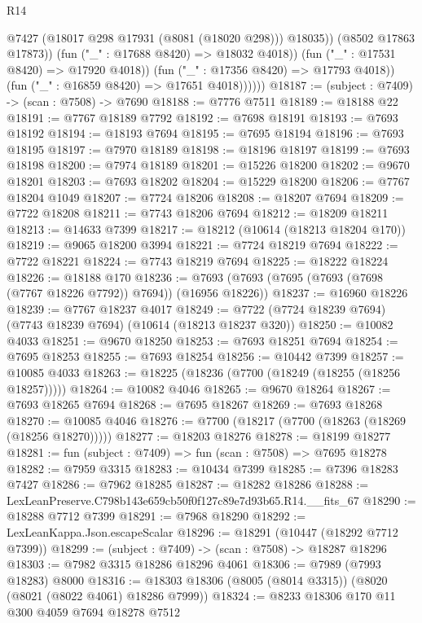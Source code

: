 \begin{lexlean}{R14}
\begin{coremodule}
                          @7427
                          (@18017 @298 @17931 (@8081 (@18020 @298)))
                          @18035))
                      (@8502 @17863 @17873))
                    (fun ("_" : @17688 @8420) => @18032 @4018))
                  (fun ("_" : @17531 @8420) => @17920 @4018))
                (fun ("_" : @17356 @8420) => @17793 @4018))
              (fun ("_" : @16859 @8420) => @17651 @4018))))))
@18187 := (subject : @7409) -> (scan : @7508) -> @7690
@18188 := @7776 @7511
@18189 := @18188 @22
@18191 := @7767 @18189 @7792
@18192 := @7698 @18191
@18193 := @7693 @18192
@18194 := @18193 @7694
@18195 := @7695 @18194
@18196 := @7693 @18195
@18197 := @7970 @18189
@18198 := @18196 @18197
@18199 := @7693 @18198
@18200 := @7974 @18189
@18201 := @15226 @18200
@18202 := @9670 @18201
@18203 := @7693 @18202
@18204 := @15229 @18200
@18206 := @7767 @18204 @1049
@18207 := @7724 @18206
@18208 := @18207 @7694
@18209 := @7722 @18208
@18211 := @7743 @18206 @7694
@18212 := @18209 @18211
@18213 := @14633 @7399
@18217 := @18212 (@10614 (@18213 @18204 @170))
@18219 := @9065 @18200 @3994
@18221 := @7724 @18219 @7694
@18222 := @7722 @18221
@18224 := @7743 @18219 @7694
@18225 := @18222 @18224
@18226 := @18188 @170
@18236 := @7693 (@7693 (@7695 (@7693 (@7698 (@7767 @18226 @7792)) @7694)) (@16956 @18226))
@18237 := @16960 @18226
@18239 := @7767 @18237 @4017
@18249 := @7722 (@7724 @18239 @7694) (@7743 @18239 @7694) (@10614 (@18213 @18237 @320))
@18250 := @10082 @4033
@18251 := @9670 @18250
@18253 := @7693 @18251 @7694
@18254 := @7695 @18253
@18255 := @7693 @18254
@18256 := @10442 @7399
@18257 := @10085 @4033
@18263 := @18225 (@18236 (@7700 (@18249 (@18255 (@18256 @18257)))))
@18264 := @10082 @4046
@18265 := @9670 @18264
@18267 := @7693 @18265 @7694
@18268 := @7695 @18267
@18269 := @7693 @18268
@18270 := @10085 @4046
@18276 := @7700 (@18217 (@7700 (@18263 (@18269 (@18256 @18270)))))
@18277 := @18203 @18276
@18278 := @18199 @18277
@18281 := fun (subject : @7409) => fun (scan : @7508) => @7695 @18278
@18282 := @7959 @3315
@18283 := @10434 @7399
@18285 := @7396 @18283 @7427
@18286 := @7962 @18285
@18287 := @18282 @18286
@18288 := LexLeanPreserve.C798b143e659cb50f0f127c89e7d93b65.R14.__fits_67
@18290 := @18288 @7712 @7399
@18291 := @7968 @18290
@18292 := LexLeanKappa.Json.escapeScalar
@18296 := @18291 (@10447 (@18292 @7712 @7399))
@18299 := (subject : @7409) -> (scan : @7508) -> @18287 @18296
@18303 := @7982 @3315 @18286 @18296 @4061
@18306 := @7989 (@7993 @18283) @8000
@18316 := @18303 @18306 (@8005 (@8014 @3315)) (@8020 (@8021 (@8022 @4061) @18286 @7999))
@18324 := @8233 @18306 @170 @11 @300 @4059 @7694 @18278 @7512

\end{coremodule}
\end{lexlean}
